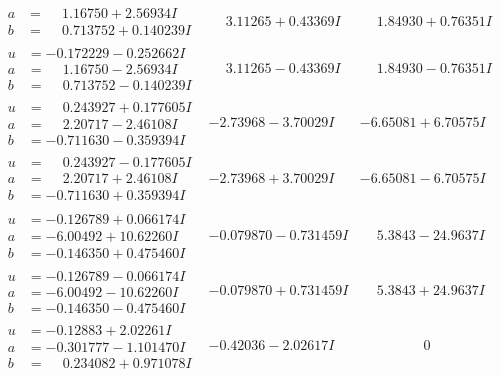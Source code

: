 \documentclass[1p]{elsarticle_modified}
\theoremstyle{definition}
\begin{document}
$$\begin{array}{c|c|c}
\begin{aligned}
a &= \phantom{-}1.16750 + 2.56934 I \\
b &= \phantom{-}0.713752 + 0.140239 I\end{aligned}
 & \phantom{-}3.11265 + 0.43369 I & \phantom{-}1.84930 + 0.76351 I \\ \hline\begin{aligned}
u &= -0.172229 - 0.252662 I \\
a &= \phantom{-}1.16750 - 2.56934 I \\
b &= \phantom{-}0.713752 - 0.140239 I\end{aligned}
 & \phantom{-}3.11265 - 0.43369 I & \phantom{-}1.84930 - 0.76351 I \\ \hline\begin{aligned}
u &= \phantom{-}0.243927 + 0.177605 I \\
a &= \phantom{-}2.20717 - 2.46108 I \\
b &= -0.711630 - 0.359394 I\end{aligned}
 & -2.73968 - 3.70029 I & -6.65081 + 6.70575 I \\ \hline\begin{aligned}
u &= \phantom{-}0.243927 - 0.177605 I \\
a &= \phantom{-}2.20717 + 2.46108 I \\
b &= -0.711630 + 0.359394 I\end{aligned}
 & -2.73968 + 3.70029 I & -6.65081 - 6.70575 I \\ \hline\begin{aligned}
u &= -0.126789 + 0.066174 I \\
a &= -6.00492 + 10.62260 I \\
b &= -0.146350 + 0.475460 I\end{aligned}
 & -0.079870 - 0.731459 I & \phantom{-}5.3843 - 24.9637 I \\ \hline\begin{aligned}
u &= -0.126789 - 0.066174 I \\
a &= -6.00492 - 10.62260 I \\
b &= -0.146350 - 0.475460 I\end{aligned}
 & -0.079870 + 0.731459 I & \phantom{-}5.3843 + 24.9637 I \\ \hline\begin{aligned}
u &= -0.12883 + 2.02261 I \\
a &= -0.301777 - 1.101470 I \\
b &= \phantom{-}0.234082 + 0.971078 I\end{aligned}
 & -0.42036 - 2.02617 I & \phantom{-0.000000 } 0 \\ \hline\begin{aligned}

\end{aligned}
\end{array}$$
\end{document}

